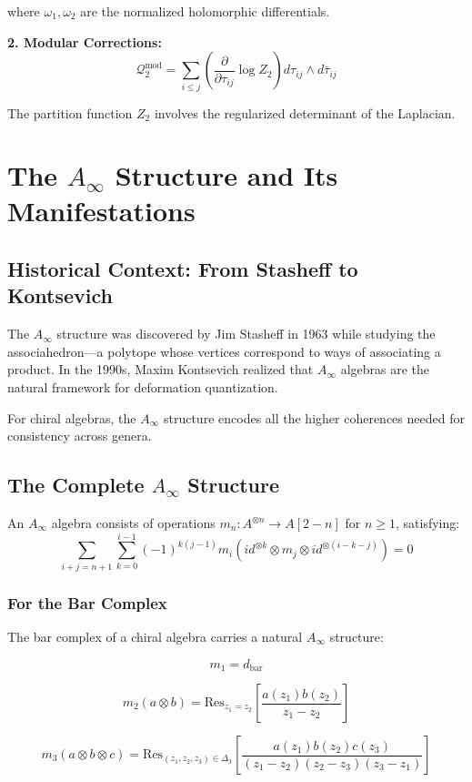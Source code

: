 where $\omega_1, \omega_2$ are the normalized holomorphic differentials.

\textbf{2. Modular Corrections:}
$$\mathcal{Q}_2^{\text{mod}} = \sum_{i \leq j} \left(\frac{\partial}{\partial \tau_{ij}} \log Z_2\right) d\tau_{ij} \wedge d\bar{\tau}_{ij}$$

The partition function $Z_2$ involves the regularized determinant of the Laplacian.

\section{The $A_\infty$ Structure and Its Manifestations}

\subsection{Historical Context: From Stasheff to Kontsevich}

The $A_\infty$ structure was discovered by Jim Stasheff in 1963 while studying the associahedron—a polytope whose vertices correspond to ways of associating a product. In the 1990s, Maxim Kontsevich realized that $A_\infty$ algebras are the natural framework for deformation quantization.

For chiral algebras, the $A_\infty$ structure encodes all the higher coherences needed for consistency across genera.

\subsection{The Complete $A_\infty$ Structure}

An $A_\infty$ algebra consists of operations $m_n: A^{\otimes n} \to A[2-n]$ for $n \geq 1$, satisfying:
$$\sum_{i+j=n+1} \sum_{k=0}^{i-1} (-1)^{k(j-1)} m_i(id^{\otimes k} \otimes m_j \otimes id^{\otimes(i-k-j)}) = 0$$

\subsubsection{For the Bar Complex}

The bar complex of a chiral algebra carries a natural $A_\infty$ structure:

$$m_1 = d_{\text{bar}}$$

$$m_2(a \otimes b) = \text{Res}_{z_1=z_2}\left[\frac{a(z_1)b(z_2)}{z_1-z_2}\right]$$

$$m_3(a \otimes b \otimes c) = \text{Res}_{(z_1,z_2,z_3) \in \Delta_3}\left[\frac{a(z_1)b(z_2)c(z_3)}{(z_1-z_2)(z_2-z_3)(z_3-z_1)}\right]$$

